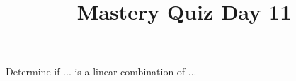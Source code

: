 \documentclass{sbgquiz}
\title{Mastery Quiz Day 11 }
\begin{document}
\begin{problem}[V2]
Determine if ... is a linear combination of ...
\end{problem}
\end{document}
